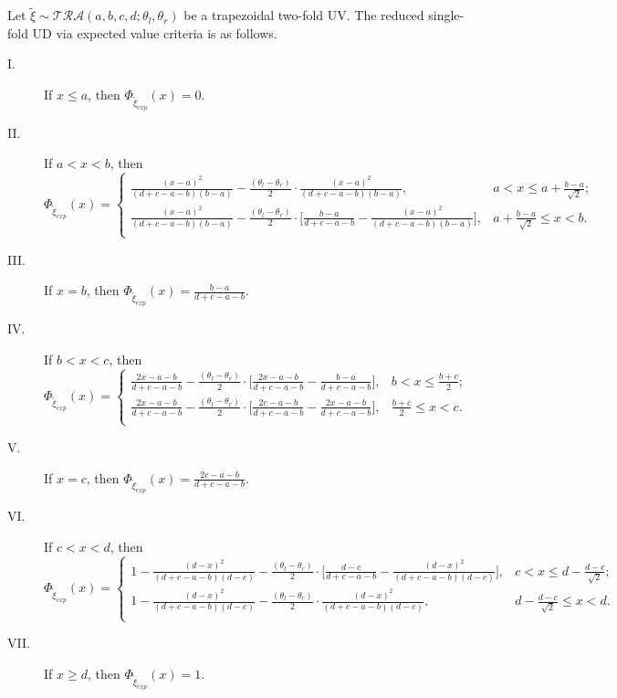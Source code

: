 \begin{theorem}\label{thm.11}
	Let $\tilde{\xi}\sim \mathcal{TRA}(a,b,c,d;\theta_l,\theta_r)$ be a trapezoidal two-fold UV. The reduced single-fold UD via expected value criteria is as follows.
	\begin{description}
		\item[ I.] If $x\leq a$, then $\Phi_{\tilde{\xi}_{exp}}(x)=0.$  
		\item[ II.] If $a< x< b$, then 
		\[\Phi_{\tilde{\xi}_{exp}}(x)=\left\{
		\begin{array}{ll}
			\frac{(x-a)^2}{(d+c-a-b)(b-a)}-\frac{(\theta_l-\theta_r)}{2}\cdot\frac{(x-a)^2}{(d+c-a-b)(b-a)}, & a<x\leq a+\frac{b-a}{\sqrt{2}};\\
			\frac{(x-a)^2}{(d+c-a-b)(b-a)}-\frac{(\theta_l-\theta_r)}{2}\cdot\big[\frac{b-a}{d+c-a-b}-\frac{(x-a)^2}{(d+c-a-b)(b-a)}\big], & a+\frac{b-a}{\sqrt{2}}\leq x<b.\\
		\end{array}
		\right.
		\]
		\item[ III.]  If $x=b$, then $\Phi_{\tilde{\xi}_{exp}}(x)=\frac{b-a}{d+c-a-b}.$ 
		\item[ IV.] If $b< x< c$, then
		\[\Phi_{\tilde{\xi}_{exp}}(x)=\left\{
		\begin{array}{ll}
			\frac{2x-a-b}{d+c-a-b}-\frac{(\theta_l-\theta_r)}{2}\cdot\big[\frac{2x-a-b}{d+c-a-b}-\frac{b-a}{d+c-a-b}\big], & b<x\leq \frac{b+c}{2};\\
			\frac{2x-a-b}{d+c-a-b}-\frac{(\theta_l-\theta_r)}{2}\cdot\big[\frac{2c-a-b}{d+c-a-b}-\frac{2x-a-b}{d+c-a-b}\big], &  \frac{b+c}{2}\leq x<c.\\
		\end{array}
		\right.
		\] 
		\item[ V.]  If $x=c$, then $\Phi_{\tilde{\xi}_{exp}}(x)=\frac{2c-a-b}{d+c-a-b}.$ 
		\item[ VI.] If $c< x< d$, then
		\[\Phi_{\tilde{\xi}_{exp}}(x)=\left\{
		\begin{array}{ll}
			1-\frac{(d-x)^2}{(d+c-a-b)(d-c)}-\frac{(\theta_l-\theta_r)}{2}\cdot\big[\frac{d-c}{d+c-a-b}-\frac{(d-x)^2}{(d+c-a-b)(d-c)}\big], & c<x\leq d-\frac{d-c}{\sqrt{2}};\\
			1-\frac{(d-x)^2}{(d+c-a-b)(d-c)}-\frac{(\theta_l-\theta_r)}{2}\cdot\frac{(d-x)^2}{(d+c-a-b)(d-c)}, & d-\frac{d-c}{\sqrt{2}}\leq x<d.\\
		\end{array}
		\right.
		\]
		\item[ VII.] If $x\geq d$, then $\Phi_{\tilde{\xi}_{exp}}(x)=1.$  
	\end{description}
\end{theorem}
